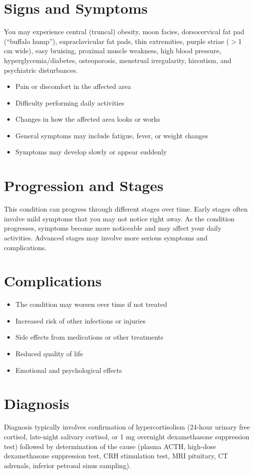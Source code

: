 \section{Signs and Symptoms}
You may experience central (truncal) obesity, moon facies, dorsocervical fat pad (``buffalo hump''), supraclavicular fat pads, thin extremities, purple striae ($>$1 cm wide), easy bruising, proximal muscle weakness, high blood pressure, hyperglycemia/diabetes, osteoporosis, menstrual irregularity, hirsutism, and psychiatric disturbances.

\begin{itemize}[noitemsep]
  \item Pain or discomfort in the affected area
  \item Difficulty performing daily activities
  \item Changes in how the affected area looks or works
  \item General symptoms may include fatigue, fever, or weight changes
  \item Symptoms may develop slowly or appear suddenly
\end{itemize}

\section{Progression and Stages}
This condition can progress through different stages over time. Early stages often involve mild symptoms that you may not notice right away. As the condition progresses, symptoms become more noticeable and may affect your daily activities. Advanced stages may involve more serious symptoms and complications.

\section{Complications}

\begin{itemize}[noitemsep]
  \item The condition may worsen over time if not treated
  \item Increased risk of other infections or injuries
  \item Side effects from medications or other treatments
  \item Reduced quality of life
  \item Emotional and psychological effects
\end{itemize}

\section{Diagnosis}
Diagnosis typically involves confirmation of hypercortisolism (24-hour urinary free cortisol, late-night salivary cortisol, or 1 mg overnight dexamethasone suppression test) followed by determination of the cause (plasma ACTH, high-dose dexamethasone suppression test, CRH stimulation test, MRI pituitary, CT adrenals, inferior petrosal sinus sampling).

